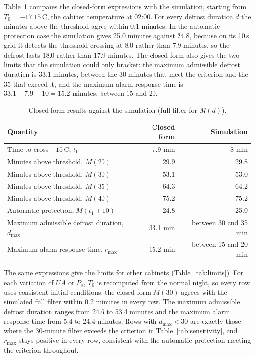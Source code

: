 \documentclass{ceurart}
\newcommand{\degC}{\,\textdegree{}C}
\begin{document}
Table~\ref{tab:closedform} compares the closed-form expressions with the simulation, starting from $T_0 = -17.15$\degC, the cabinet temperature at 02:00.
For every defrost duration $d$ the minutes above the threshold agree within 0.1 minutes.
In the automatic-protection case the simulation gives 25.0 minutes against 24.8, because on its 10\,s grid it detects the threshold crossing at 8.0 rather than 7.9 minutes, so the defrost lasts 18.0 rather than 17.9 minutes.
The closed form also gives the two limits that the simulation could only bracket: the maximum admissible defrost duration is 33.1 minutes, between the 30 minutes that meet the criterion and the 35 that exceed it, and the maximum alarm response time is $33.1 - 7.9 - 10 = 15.2$ minutes, between 15 and 20.

\begin{table}[ht]
  \caption{Closed-form results against the simulation (full filter for $M(d)$).}
  \label{tab:closedform}
  \begin{tabular}{@{}lrr@{}}
    \toprule
    Quantity & Closed form & Simulation \\
    \midrule
    Time to cross $-15$\degC, $t_1$ & 7.9 min & 8 min \\
    Minutes above threshold, $M(20)$ & 29.9 & 29.8 \\
    Minutes above threshold, $M(30)$ & 53.1 & 53.0 \\
    Minutes above threshold, $M(35)$ & 64.3 & 64.2 \\
    Minutes above threshold, $M(40)$ & 75.2 & 75.2 \\
    Automatic protection, $M(t_1 + 10)$ & 24.8 & 25.0 \\
    Maximum admissible defrost duration, $d_{\max}$ & 33.1 min & between 30 and 35 min \\
    Maximum alarm response time, $r_{\max}$ & 15.2 min & between 15 and 20 min \\
    \bottomrule
  \end{tabular}
\end{table}

The same expressions give the limits for other cabinets (Table~\ref{tab:limits}).
For each variation of $UA$ or $P_s$, $T_0$ is recomputed from the normal night, so every row uses consistent initial conditions; the closed-form $M(30)$ agrees with the simulated full filter within 0.2 minutes in every row.
The maximum admissible defrost duration ranges from 24.6 to 53.4 minutes and the maximum alarm response time from 5.4 to 24.4 minutes.
Rows with $d_{\max} < 30$ are exactly those where the 30-minute filter exceeds the criterion in Table~\ref{tab:sensitivity}, and $r_{\max}$ stays positive in every row, consistent with the automatic protection meeting the criterion throughout.
\end{document}
